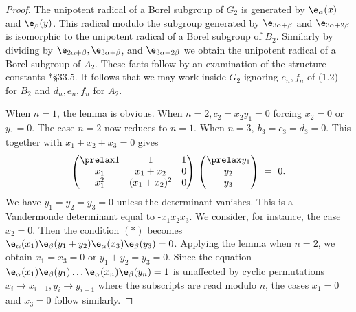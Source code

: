 \documentclass{memo-l}
\theoremstyle{definition}
\theoremstyle{remark}
\numberwithin{section}{chapter}
\numberwithin{equation}{chapter}
\begin{document}
\begin{proof}     The unipotent radical of a Borel subgroup of $G_{2}$ is
generated by ${\e}_{\alpha}(x)$ and ${\e}_{\beta}(y)$.
 This radical modulo the subgroup generated by ${\e}_{3{\alpha} +
{\beta}}$ and ${\e}_{3{\alpha}+2{\beta}}$ is isomorphic to the
unipotent radical of a Borel subgroup of $B_{2}$.
 Similarly by dividing by ${\e}_{2{\alpha}+{\beta}},
{\e}_{3{\alpha}+{\beta}}$, and ${\e}_{3{\alpha}+2{\beta}}$ we
obtain the unipotent radical of a Borel subgroup of $A_{2}$.
 These facts follow by an examination of the structure constants \cite{MR0396773}*{\S33.5}.
 It follows that we may work
inside $G_{2}$ ignoring $e_{n},f_{n}$ of (1.2) for $B_{2}$ and $d_{n},e_{n},
f_{n}$ for $A_{2}$.

   When $n = 1$, the lemma is obvious.
 When $n = 2, c_{2} = x_{2}y_{1} = 0$ forcing $x_{2} = 0$ or $y_{1} = 0$.
 The case $n = 2$ now reduces to $n = 1$.
 When $n = 3,\ b_{3} = c_{3} = d_{3} = 0$.
 This together with $x_{1}+x_{2}+x_{3} = 0$ gives
$$
{\begin{pmatrix} \prelax
 1 & 1 & 1 \\
x_{1} & x_1+x_2 & 0 \\ x_1^2 & (x_1+x_2)^2 & 0 \end{pmatrix}}\
{\begin{pmatrix} \prelax  y_1 \\ y_2 \\ y_3 \end{pmatrix}}\ =\ 0 .
$$
We have $y_{1} = y_{2} = y_{3} = 0$ unless the determinant vanishes.
 This is a Vandermonde determinant equal to -$x_{1}x_{2}x_{3}$.
 We consider, for instance, the case $x_{2} = 0$.
 Then the condition $(*)$ becomes ${\e}_{\alpha}(x_{1})
{\e}_{\beta}(y_{1}+y_{2}){\e}_{\alpha}(x_{3})
{\e}_{\beta}(y_{3}) = 0$.
 Applying the lemma when $n=2$, we obtain $x_{1} = x_{3} = 0$ or
$y_{1}+y_{2} = y_{3} =  0$.
 Since the equation ${\e}_{\alpha}(x_{1}){\e}_{\beta}(y_{1})
\ldots {\e}_{\alpha}(x_{n}){\e}_{\beta}(y_{n}) = 1$ is
unaffected by cyclic permutations $x_{i} {\to} x_{i+1}, y_{i} {\to} y_{i+1}$
where the subscripts are read modulo $n$, the cases $x_{1} = 0$ and $x_{3} = 0$
follow similarly.


\end{proof}
\end{document}

